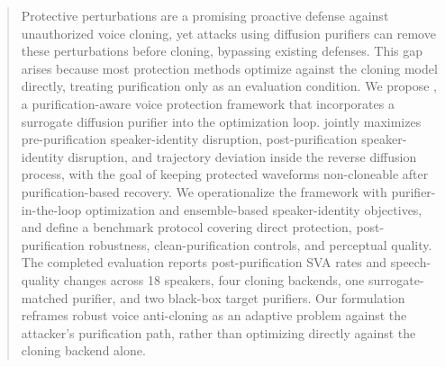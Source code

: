 ﻿\begin{abstract}
Protective perturbations are a promising proactive defense against unauthorized voice cloning, 
yet attacks using diffusion purifiers can remove these perturbations before cloning, bypassing existing defenses. 
This gap arises because most protection methods optimize against the cloning model directly, treating purification only as an evaluation condition. 
We propose \method, a purification-aware voice protection framework that incorporates a surrogate diffusion purifier into the optimization loop. 
\method{} jointly maximizes pre-purification speaker-identity disruption, post-purification speaker-identity disruption, and trajectory deviation inside the reverse diffusion process, 
with the goal of keeping protected waveforms non-cloneable after purification-based recovery.
We operationalize the framework with purifier-in-the-loop optimization and ensemble-based speaker-identity objectives, 
and define a benchmark protocol covering direct protection, post-purification robustness, clean-purification controls, and perceptual quality. 
The completed evaluation reports post-purification SVA rates and speech-quality changes across 18 speakers, four cloning backends, one surrogate-matched purifier, and two black-box target purifiers.
Our formulation reframes robust voice anti-cloning as an adaptive problem against the attacker's purification path,
rather than optimizing directly against the cloning backend alone.
\end{abstract}
